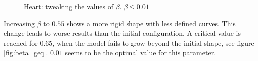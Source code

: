 \begin{figure}[!hbt]
\centering   
{}
\caption{Heart: tweaking the values of $ \beta $. $\beta \leq 0.01$}
\label{fig:beta_leq}
\end{figure}

Increasing $\beta$ to $0.55$ shows a more rigid shape with less defined curves. This change leads to worse results than the initial configuration. A critical value is reached for $0.65$, when the model fails to grow beyond the initial shape, see figure \ref{fig:beta_geq}. $0.01$ seems to be the optimal value for this parameter.

